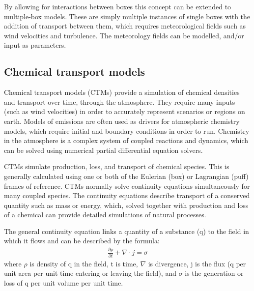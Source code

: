     By allowing for interactions between boxes this concept can be extended to multiple-box models.
    These are simply multiple instances of single boxes with the addition of transport between them, which requires meteorological fields such as wind velocities and turbulence.
    The meteorology fields can be modelled, and/or input as parameters.
  
  
  \subsection{Chemical transport models}
    Chemical transport models (CTMs) provide a simulation of chemical densities and transport over time, through the atmosphere.
    They require many inputs (such as wind velocities) in order to accurately represent scenarios or regions on earth.
    Models of emissions are often used as drivers for atmospheric chemistry models, which require initial and boundary conditions in order to run.
    Chemistry in the atmosphere is a complex system of coupled reactions and dynamics, which can be solved using numerical partial differential equation solvers.
    
    CTMs simulate production, loss, and transport of chemical species.
    This is generally calculated using one or both of the Eulerian (box) or Lagrangian (puff) frames of reference.
    CTMs normally solve continuity equations simultaneously for many coupled species.
    The continuity equations describe transport of a conserved quantity such as mass or energy, which, solved together with production and loss of a chemical can provide detailed simulations of natural processes.
    
    The general continuity equation links a quantity of a substance (q) to the field in which it flows and can be described by the formula:
    \begin{align*}
      \frac{\partial \rho}{\partial t} + \nabla \cdot j = \sigma 
    \end{align*}
    where $\rho$ is density of q in the field, t is time, $\nabla$ is divergence, j is the flux (q per unit area per unit time entering or leaving the field), and $\sigma$ is the generation or loss of q per unit volume per unit time.
    
